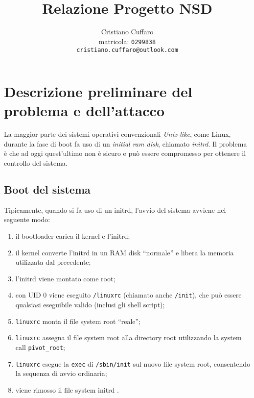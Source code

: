 \documentclass{article}
\begin{document}
\author{%
	Cristiano Cuffaro \\
	{\small matricola: \texttt{0299838}} \\
	{\small \texttt{cristiano.cuffaro@outlook.com}}
}
\title{Relazione Progetto NSD}

\begin{titlingpage}		
	\maketitle
	\tableofcontents
\end{titlingpage}

\newpage

\section{Descrizione preliminare del problema e dell'attacco}
La maggior parte dei sistemi operativi convenzionali \textsl{Unix-like}, come Linux, durante la fase di boot fa uso di un \textsl{initial ram disk}, chiamato \textsl{initrd}. Il problema è che ad oggi quest'ultimo non è sicuro e può essere compromesso per ottenere il controllo del sistema.

\subsection{Boot del sistema}
Tipicamente, quando si fa uso di un initrd, l'avvio del sistema avviene nel seguente modo:
\begin{enumerate}
	\item il bootloader carica il kernel e l'initrd;
	\item il kernel converte l'initrd in un RAM disk ``normale'' e libera la memoria utilizzata dal precedente;
	\item l'initrd viene montato come root;
	\item con UID 0 viene eseguito \texttt{/linuxrc} (chiamato anche \texttt{/init}), che può essere qualsiasi eseguibile valido (inclusi gli shell script);
	\item \texttt{linuxrc} monta il file system root ``reale'';
	\item \texttt{linuxrc} assegna il file system root alla directory root utilizzando la system call \texttt{pivot\_root};
	\item \texttt{linuxrc} esegue la \texttt{exec} di \texttt{/sbin/init} sul nuovo file system root, consentendo la sequenza di avvio ordinaria;
	\item viene rimosso il file system initrd \cite{initrd}.
\end{enumerate}
\end{document}
